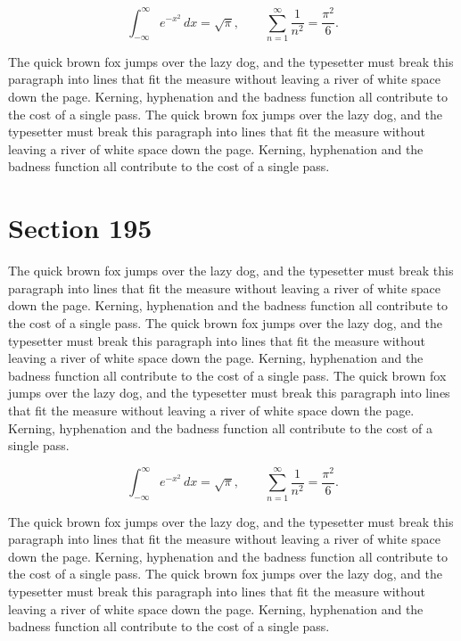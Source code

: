\documentclass{article}
\begin{document}
\begin{equation}
\int_{-\infty}^{\infty} e^{-x^{2}}\,dx = \sqrt{\pi}, \qquad
\sum_{n=1}^{\infty} \frac{1}{n^{2}} = \frac{\pi^{2}}{6}.
\end{equation}

The quick brown fox jumps over the lazy dog, and the typesetter must break this paragraph into lines that fit the measure without leaving a river of white space down the page. Kerning, hyphenation and the badness function all contribute to the cost of a single pass. The quick brown fox jumps over the lazy dog, and the typesetter must break this paragraph into lines that fit the measure without leaving a river of white space down the page. Kerning, hyphenation and the badness function all contribute to the cost of a single pass. 
\section{Section 195}
The quick brown fox jumps over the lazy dog, and the typesetter must break this paragraph into lines that fit the measure without leaving a river of white space down the page. Kerning, hyphenation and the badness function all contribute to the cost of a single pass. The quick brown fox jumps over the lazy dog, and the typesetter must break this paragraph into lines that fit the measure without leaving a river of white space down the page. Kerning, hyphenation and the badness function all contribute to the cost of a single pass. The quick brown fox jumps over the lazy dog, and the typesetter must break this paragraph into lines that fit the measure without leaving a river of white space down the page. Kerning, hyphenation and the badness function all contribute to the cost of a single pass. 

\begin{equation}
\int_{-\infty}^{\infty} e^{-x^{2}}\,dx = \sqrt{\pi}, \qquad
\sum_{n=1}^{\infty} \frac{1}{n^{2}} = \frac{\pi^{2}}{6}.
\end{equation}

The quick brown fox jumps over the lazy dog, and the typesetter must break this paragraph into lines that fit the measure without leaving a river of white space down the page. Kerning, hyphenation and the badness function all contribute to the cost of a single pass. The quick brown fox jumps over the lazy dog, and the typesetter must break this paragraph into lines that fit the measure without leaving a river of white space down the page. Kerning, hyphenation and the badness function all contribute to the cost of a single pass. 
\end{document}
